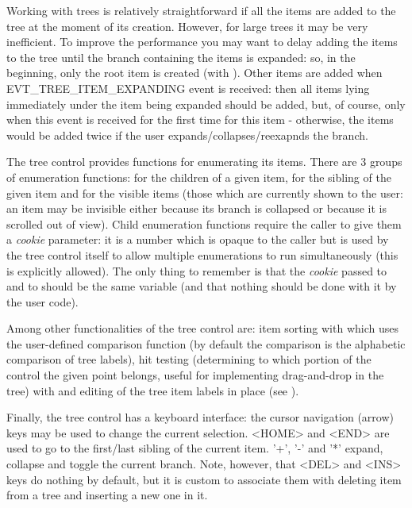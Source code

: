 Working with trees is relatively straightforward if all the items are added to
the tree at the moment of its creation. However, for large trees it may be
very inefficient. To improve the performance you may want to delay adding the
items to the tree until the branch containing the items is expanded: so, in the
beginning, only the root item is created (with 
). Other items are added when
EVT\_TREE\_ITEM\_EXPANDING event is received: then all items lying immediately
under the item being expanded should be added, but, of course, only when this
event is received for the first time for this item - otherwise, the items would
be added twice if the user expands/collapses/reexapnds the branch.

The tree control provides functions for enumerating its items. There are 3
groups of enumeration functions: for the children of a given item, for the
sibling of the given item and for the visible items (those which are currently
shown to the user: an item may be invisible either because its branch is
collapsed or because it is scrolled out of view). Child enumeration functions
require the caller to give them a {\it cookie} parameter: it is a number which
is opaque to the caller but is used by the tree control itself to allow
multiple enumerations to run simultaneously (this is explicitly allowed). The
only thing to remember is that the {\it cookie} passed to 
 and to 
 should be the same variable (and
that nothing should be done with it by the user code).

Among other functionalities of the tree control are: item sorting with 
 which uses the user-defined comparison
function  (by default the
comparison is the alphabetic comparison of tree labels), hit testing
(determining to which portion of the control the given point belongs, useful
for implementing drag-and-drop in the tree) with 
 and editing of the tree item labels in
place (see ).

Finally, the tree control has a keyboard interface: the cursor navigation (arrow) keys
may be used to change the current selection. <HOME> and <END> are used to go to
the first/last sibling of the current item. '+', '-' and '*' expand, collapse
and toggle the current branch. Note, however, that <DEL> and <INS> keys do
nothing by default, but it is custom to associate them with deleting item from
a tree and inserting a new one in it.
